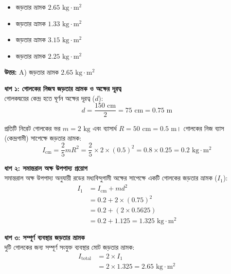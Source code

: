 \documentclass[12pt, a4paper]{article}
\begin{document}
\begin{itemize}[label={}, leftmargin=1cm, itemsep=0.5em]
    \item[\textbf{A)}] জড়তার ভ্রামক $2.65\text{ kg}\cdot\text{m}^2$
    \item[\textbf{B)}] জড়তার ভ্রামক $1.33\text{ kg}\cdot\text{m}^2$
    \item[\textbf{C)}] জড়তার ভ্রামক $3.15\text{ kg}\cdot\text{m}^2$
    \item[\textbf{D)}] জড়তার ভ্রামক $2.25\text{ kg}\cdot\text{m}^2$
\end{itemize}

\vspace{0.5em}
\begin{tcolorbox}[answerbox]
    \textbf{\color{success} উত্তর:} A) জড়তার ভ্রামক $2.65\text{ kg}\cdot\text{m}^2$
\end{tcolorbox}
\vspace{1em}

\begin{tcolorbox}[solutionbox={সমাধান (Solution)}]
    \noindent
    \textbf{ধাপ ১: গোলকের নিজস্ব জড়তার ভ্রামক ও অক্ষের দূরত্ব} \\
    গোলকদ্বয়ের কেন্দ্র হতে ঘূর্ণন অক্ষের দূরত্ব ($d$):
    \[ d = \frac{150\text{ cm}}{2} = 75\text{ cm} = 0.75\text{ m} \]
    
    প্রতিটি নিরেট গোলকের ভর $m = 2\text{ kg}$ এবং ব্যাসার্ধ $R = 50\text{ cm} = 0.5\text{ m}$। 
    গোলকের নিজ ব্যাস (কেন্দ্রগামী) সাপেক্ষে জড়তার ভ্রামক:
    \[ I_{\text{cm}} = \frac{2}{5} m R^2 = \frac{2}{5} \times 2 \times (0.5)^2 = 0.8 \times 0.25 = 0.2\text{ kg}\cdot\text{m}^2 \]
    
    \vspace{0.5em}
    \noindent\textbf{ধাপ ২: সমান্তরাল অক্ষ উপপাদ্য প্রয়োগ} \\
    সমান্তরাল অক্ষ উপপাদ্য অনুযায়ী রডের মধ্যবিন্দুগামী অক্ষের সাপেক্ষে একটি গোলকের জড়তার ভ্রামক ($I_1$):
    \begin{align*}
        I_1 &= I_{\text{cm}} + m d^2 \\
            &= 0.2 + 2 \times (0.75)^2 \\
            &= 0.2 + (2 \times 0.5625) \\
            &= 0.2 + 1.125 = 1.325\text{ kg}\cdot\text{m}^2
    \end{align*}
    
    \vspace{0.5em}
    \noindent\textbf{ধাপ ৩: সম্পূর্ণ ব্যবস্থার জড়তার ভ্রামক} \\
    দুটি গোলকের জন্য সম্পূর্ণ সংযুক্ত ব্যবস্থার মোট জড়তার ভ্রামক:
    \begin{align*}
        I_{\text{total}} &= 2 \times I_1 \\
        &= 2 \times 1.325 = \mathbf{2.65}\text{ kg}\cdot\text{m}^2
    \end{align*}
\end{tcolorbox}
\end{document}
